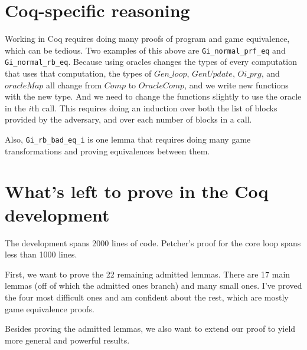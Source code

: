 \documentclass[12pt,lot, lof]{puthesis}
\newcommand{\li} {\lstinline}
\begin{document}
{\section{Coq-specific reasoning} \label{sec:coq_specific_reasoning}

Working in Coq requires doing many proofs of program and game equivalence, which can be tedious. Two examples of this above are \li|Gi_normal_prf_eq| and \li|Gi_normal_rb_eq|. Because using oracles changes the types of every computation that uses that computation, the types of $Gen\_loop$, $GenUpdate$, $Oi\_prg$, and $oracleMap$ all change from $Comp$ to $OracleComp$, and we write new functions with the new type. And we need to change the functions slightly to use the oracle in the $i$th call. This requires doing an induction over both the list of blocks provided by the adversary, and over each number of blocks in a call.

Also, \li|Gi_rb_bad_eq_i| is one lemma that requires doing many game transformations and proving equivalences between them.

\section{What's left to prove in the Coq development} \label{sec:whats_left_to_prove_in_the_coq_development}

The development spans 2000 lines of code. Petcher's proof for the core loop spans less than 1000 lines.

First, we want to prove the 22 remaining admitted lemmas. There are 17 main lemmas (off of which the admitted ones branch) and many small ones. I've proved the four most difficult ones and am confident about the rest, which are mostly game equivalence proofs. 

Besides proving the admitted lemmas, we also want to extend our proof to yield more general and powerful results.

}
\end{document}
